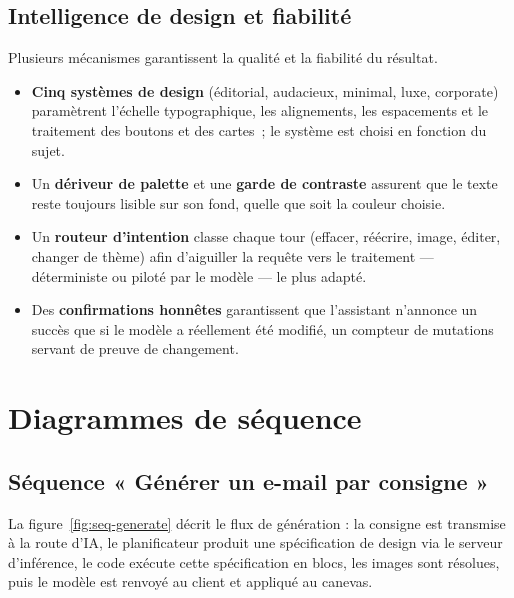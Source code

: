 
\subsection{Intelligence de design et fiabilité}
Plusieurs mécanismes garantissent la qualité et la fiabilité du résultat.
\begin{itemize}[leftmargin=1.4cm]
  \item \textbf{Cinq systèmes de design} (éditorial, audacieux, minimal,
  luxe, corporate) paramètrent l'échelle typographique, les alignements, les
  espacements et le traitement des boutons et des cartes~; le système est
  choisi en fonction du sujet.
  \item Un \textbf{dériveur de palette} et une \textbf{garde de contraste}
  assurent que le texte reste toujours lisible sur son fond, quelle que soit
  la couleur choisie.
  \item Un \textbf{routeur d'intention} classe chaque tour (effacer,
  réécrire, image, éditer, changer de thème) afin d'aiguiller la requête vers
  le traitement — déterministe ou piloté par le modèle — le plus adapté.
  \item Des \textbf{confirmations honnêtes} garantissent que l'assistant
  n'annonce un succès que si le modèle a réellement été modifié, un
  compteur de mutations servant de preuve de changement.
\end{itemize}

\section{Diagrammes de séquence}

\subsection{Séquence « Générer un e-mail par consigne »}
La figure~\ref{fig:seq-generate} décrit le flux de génération : la consigne
est transmise à la route d'IA, le planificateur produit une spécification de
design via le serveur d'inférence, le code exécute cette spécification en
blocs, les images sont résolues, puis le modèle est renvoyé au client et
appliqué au canevas.


